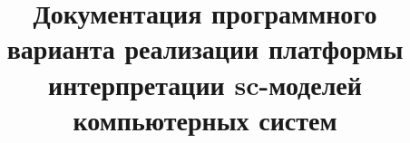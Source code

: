 \documentclass{scndocument}
\begin{document}
\DeactivateBG
\title{\centering
Документация программного варианта реализации платформы интерпретации sc-моделей компьютерных систем}
\author{}
\maketitle

\normalsize

\setcounter{page}{3}

\ActivateBG
\begin{SCn}


\end{SCn}
\end{document}
